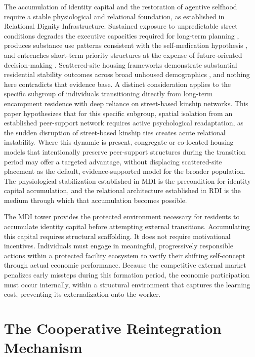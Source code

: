 \documentclass[12pt, letterpaper]{article}
\begin{document}
The accumulation of identity capital and the restoration of agentive selfhood require a stable physiological and relational foundation, as established in Relational Dignity Infrastructure. Sustained exposure to unpredictable street conditions degrades the executive capacities required for long-term planning \citep{arnsten2009stress}, produces substance use patterns consistent with the self-medication hypothesis \citep{khantzian1985self}, and entrenches short-term priority structures at the expense of future-oriented decision-making \citep{volkow2016neurobiologic}. Scattered-site housing frameworks demonstrate substantial residential stability outcomes across broad unhoused demographics \citep{tsemberis2004housing}, and nothing here contradicts that evidence base. A distinct consideration applies to the specific subgroup of individuals transitioning directly from long-term encampment residence with deep reliance on street-based kinship networks. This paper hypothesizes that for this specific subgroup, spatial isolation from an established peer-support network requires active psychological readaptation, as the sudden disruption of street-based kinship ties creates acute relational instability. Where this dynamic is present, congregate or co-located housing models that intentionally preserve peer-support structures during the transition period may offer a targeted advantage, without displacing scattered-site placement as the default, evidence-supported model for the broader population. The physiological stabilization established in MDI is the precondition for identity capital accumulation, and the relational architecture established in RDI is the medium through which that accumulation becomes possible.

The MDI tower provides the protected environment necessary for residents to accumulate identity capital before attempting external transitions. Accumulating this capital requires structural scaffolding. It does not require motivational incentives. Individuals must engage in meaningful, progressively responsible actions within a protected facility ecosystem to verify their shifting self-concept through actual economic performance. Because the competitive external market penalizes early missteps during this formation period, the economic participation must occur internally, within a structural environment that captures the learning cost, preventing its externalization onto the worker.

\section{The Cooperative Reintegration Mechanism}
\end{document}
